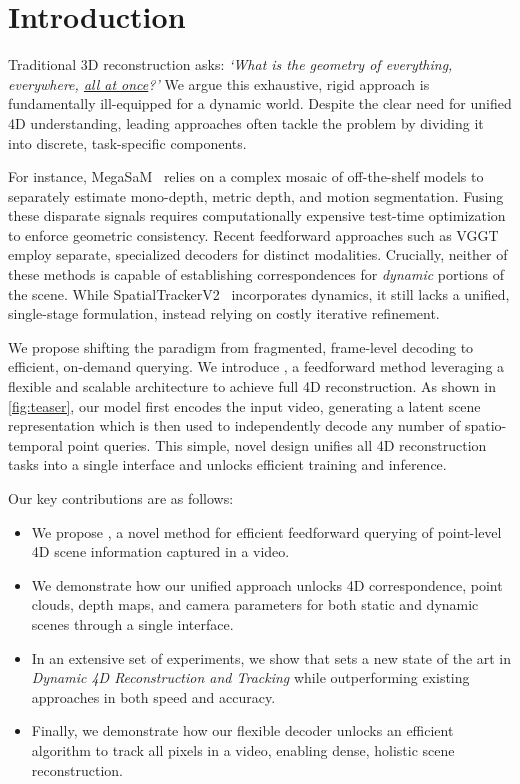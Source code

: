 \section{Introduction}
\label{sec:intro}

Traditional 3D reconstruction asks:
\emph{`What is the geometry of everything, everywhere, \underline{all at once}?'}
We argue this exhaustive, rigid approach is fundamentally ill-equipped for a dynamic world.
Despite the clear need for unified 4D understanding, leading approaches often tackle the problem by dividing it into discrete, task-specific components.

For instance, MegaSaM~\cite{li2025megasam} relies on a complex mosaic of off-the-shelf models to separately estimate mono-depth, metric depth, and motion segmentation.
Fusing these disparate signals requires computationally expensive test-time optimization to enforce geometric consistency.
Recent feedforward approaches such as VGGT~\cite{wang2025vggt} employ separate, specialized decoders for distinct modalities.
Crucially, neither of these methods is capable of establishing correspondences for \emph{dynamic} portions of the scene.
While SpatialTrackerV2~\cite{xiao2025spatialtrackerv2} incorporates dynamics, it still lacks a unified, single-stage formulation, instead relying on costly iterative refinement.



We propose shifting the paradigm from fragmented, frame-level decoding to efficient, on-demand querying.
We introduce \name, a feedforward method leveraging a flexible and scalable architecture to achieve full 4D reconstruction.
As shown in \cref{fig:teaser}, our model first encodes the input video, generating a latent scene representation which is then used to independently decode any number of spatio-temporal point queries.
This simple, novel design unifies all 4D reconstruction tasks into a single interface and unlocks efficient training and inference.


\noindent Our key contributions are as follows:
\begin{itemize}
    \item We propose \name, a novel method for efficient feedforward querying of point-level 4D scene information captured in a video.
    \item We demonstrate how our unified approach unlocks 4D correspondence, point clouds, depth maps, and camera parameters for both static and dynamic scenes through a single interface.
    \item In an extensive set of experiments, we show that \name sets a new state of the art in
    \emph{Dynamic 4D Reconstruction and Tracking} while outperforming existing approaches in both speed and accuracy.
    \item Finally, we demonstrate how our flexible decoder unlocks an efficient algorithm to track all pixels in a video, enabling dense, holistic scene reconstruction.
\end{itemize}
